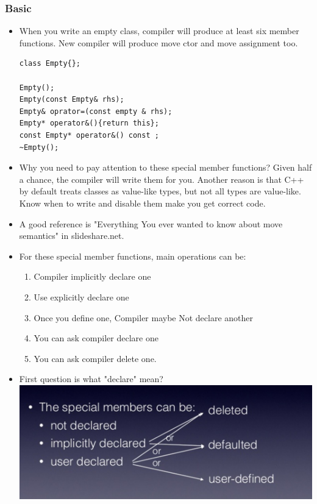 \documentclass[a4paper,11pt,twoside]{book}
\begin{document}
\subsubsection{Basic}

\begin{itemize}

\item When you write an empty class, compiler will produce at least six member functions.  New compiler will produce move ctor and move assignment too.
\begin{lstlisting}[numbers=none]
class Empty{};

Empty();
Empty(const Empty& rhs);
Empty& oprator=(const empty & rhs);
Empty* operator&(){return this};
const Empty* operator&() const ;
~Empty();
\end{lstlisting}

\item Why you need to pay attention to these special member functions?  Given half a chance, the compiler will write them for you. Another reason is that C++ by default treats classes as value-like types, but not all types are value-like. Know when to write and disable them make you get correct code.

\item A good reference is "Everything You ever wanted to know about move semantics" in slideshare.net.

\item For these special member functions, main operations can be:
\begin{enumerate}
\item Compiler implicitly declare one
\item Use explicitly declare one
\item Once you define one, Compiler maybe Not declare another
\item You can ask compiler declare one
\item You can ask compiler delete one.
\end{enumerate}

\item First question is what "declare" mean?  \\
\includegraphics[scale=0.6]{pics/sm1.png} \newline


\end{itemize}
\end{document}
